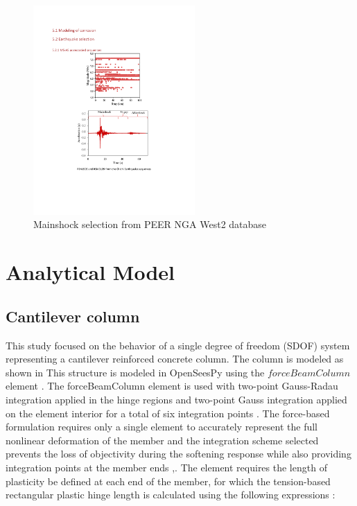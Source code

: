 \begin{figure}[htbp]
	\centering
	\includegraphics[width=0.55\textwidth]{Chapter-5/figs/MS_AS_Figure.pdf}
	\caption{Mainshock selection from PEER NGA West2 database}
	\label{fig:MS-AS_sequence_sample}
\end{figure}

\section{Analytical Model}
\subsection{Cantilever column}
This study focused on the behavior of a single degree of freedom (SDOF) system representing a cantilever reinforced concrete column. The column is modeled as shown in  This structure is modeled in OpenSeesPy \cite{McKenna2010}\cite{Zhu2018} using the $forceBeamColumn$ element \cite{Scott}. The forceBeamColumn element is used with two-point Gauss-Radau integration applied in the hinge regions and two-point Gauss integration applied on the element interior for a total of six integration points \cite{Scott}. The force-based formulation requires only a single element to accurately represent the full nonlinear deformation of the member and the integration scheme selected prevents the loss of objectivity during the softening response while also providing integration points at the member ends \cite{Calabrese2010},\cite{Scott}. The element requires the length of plasticity be defined at each end of the member, for which the tension-based rectangular plastic hinge length is calculated using the following expressions \cite{Goodnight2013}:

